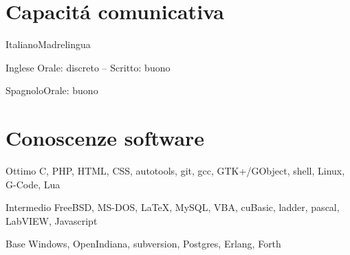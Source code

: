 \documentclass[fontsize=10pt]{tccv}
\begin{document}
\section{Capacit\'a comunicativa}

\begin{factlist}
\item{Italiano}{Madrelingua}
\item{Inglese} {Orale: discreto -- Scritto: buono}
\item{Spagnolo}{Orale: buono}
\end{factlist}

\section{Conoscenze software}

\begin{factlist}

\item{Ottimo}
     {C, PHP, HTML, CSS, autotools, git, gcc, GTK+/GObject, shell,
      Linux, G-Code, Lua}

\item{Intermedio}
     {FreeBSD, MS-DOS, \LaTeX, MySQL, VBA, cuBasic, ladder, pascal,
      LabVIEW, Javascript}

\item{Base}
     {Windows, OpenIndiana, subversion, Postgres, Erlang, Forth}

\end{factlist}
\end{document}
